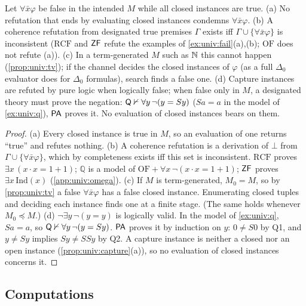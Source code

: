 \begin{proposition}\label{prop:univ:refute}
Let $\forall\bar x\varphi$ be false in the intended $M$ while all closed instances are true.
\textup{(a)} No refutation that ends by evaluating closed instances condemns $\forall\bar x\varphi$.
\textup{(b)} A coherence refutation from designated true premises $\Gamma$ exists iff $\Gamma\cup\{\forall\bar x\varphi\}$ is inconsistent ($\mathrm{RCF}$ and $\mathsf{ZF}$ refute the examples of \cref{ex:univ:fail}(a),(b); $\mathrm{OF}$ does not refute (a)).
\textup{(c)} In a term-generated $M$ such as $\mathbb{N}$ this cannot happen (\cref{prop:univ:tv}); if the channel decides the closed instances of $\varphi$ (as a full $\Delta_0$ evaluator does for $\Delta_0$ formulas), search finds a false one.
\textup{(d)} Capture instances are refuted by pure logic when logically false; when false only in $M$, a designated theory must prove the negation: $\mathsf{Q}\nvdash\forall y\,\neg(y=Sy)$ ($Sa=a$ in the model of \cref{ex:univ:q}), $\mathsf{PA}$ proves it. No evaluation of closed instances bears on them.
\end{proposition}

\begin{proof}
(a) Every closed instance is true in $M$, so an evaluation of one returns ``true'' and refutes nothing.
(b) A coherence refutation is a derivation of $\bot$ from $\Gamma\cup\{\forall\bar x\varphi\}$, which by completeness exists iff this set is inconsistent. $\mathrm{RCF}$ proves $\exists x\,(x\cdot x=1+1)$; $\mathbb Q$ is a model of $\mathrm{OF}+\forall x\,\neg(x\cdot x=1+1)$; $\mathsf{ZF}$ proves $\exists x\,\mathrm{Ind}(x)$ (\cref{app:univ:omega}).
(c) If $M$ is term-generated, $M_0=M$, so by \cref{prop:univ:tv} a false $\forall\bar x\varphi$ has a false closed instance. Enumerating closed tuples and deciding each instance finds one at a finite stage. (The same holds whenever $M_0\preceq M$.)
(d) $\neg\exists y\,\neg(y=y)$ is logically valid. In the model of \cref{ex:univ:q}, $Sa=a$, so $\mathsf{Q}\nvdash\forall y\,\neg(y=Sy)$. $\mathsf{PA}$ proves it by induction on $y$: $0\neq S0$ by Q1, and $y\neq Sy$ implies $Sy\neq SSy$ by Q2. A capture instance is neither a closed nor an open instance (\cref{prop:univ:capture}(a)), so no evaluation of closed instances concerns it.
\end{proof}

\subsection{Computations}\label{app:univ:comp}

